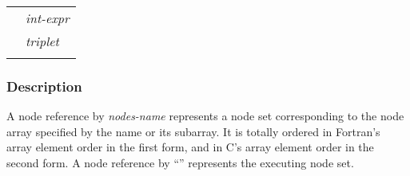 \hspace{\hsize}

\begin{tabular}{ll}
 \hspace{0.5cm} & {\it int-expr} \\
 \hspace{0.5cm} & {\it triplet} \\
 \hspace{0.5cm} & {\tt *} \\
\end{tabular}


\subsubsection*{Description}


A node reference by {\it nodes-name} represents a node set corresponding
to the node array specified by the name or its subarray.
It is totally ordered in Fortran's array element order in the first form, 
and in C's array element order in the second form.
%
A node reference by ``{\tt *}''
represents the executing node set. 


